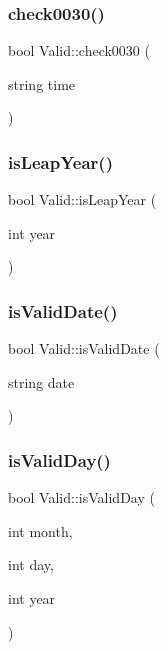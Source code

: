 \mbox{\label{class_valid_ac00909d3e4041ccdbbfda3d3a796c53a}} 
\subsubsection{\texorpdfstring{check0030()}{check0030()}}
{\footnotesize\ttfamily bool Valid\+::check0030 (\begin{DoxyParamCaption}\item[{string}]{time }\end{DoxyParamCaption})\hspace{0.3cm}{\ttfamily [private]}}

\mbox{\label{class_valid_a710d1da68dfdeb36e8581224783e6e4a}} 
\subsubsection{\texorpdfstring{is\+Leap\+Year()}{isLeapYear()}}
{\footnotesize\ttfamily bool Valid\+::is\+Leap\+Year (\begin{DoxyParamCaption}\item[{int}]{year }\end{DoxyParamCaption})\hspace{0.3cm}{\ttfamily [private]}}

\mbox{\label{class_valid_a1a8c6ac97f62977d8c52ff61d16d28a0}} 
\subsubsection{\texorpdfstring{is\+Valid\+Date()}{isValidDate()}}
{\footnotesize\ttfamily bool Valid\+::is\+Valid\+Date (\begin{DoxyParamCaption}\item[{string}]{date }\end{DoxyParamCaption})}

\mbox{\label{class_valid_a3abb63c2d1863364967272e3d33e7ba3}} 
\subsubsection{\texorpdfstring{is\+Valid\+Day()}{isValidDay()}}
{\footnotesize\ttfamily bool Valid\+::is\+Valid\+Day (\begin{DoxyParamCaption}\item[{int}]{month,  }\item[{int}]{day,  }\item[{int}]{year }\end{DoxyParamCaption})\hspace{0.3cm}{\ttfamily [private]}}

